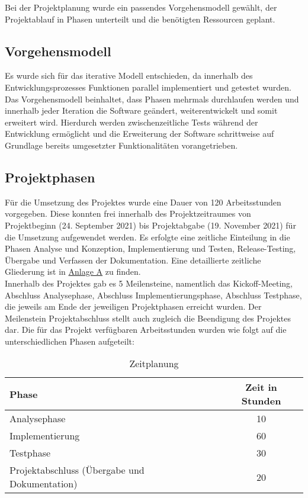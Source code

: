 Bei der Projektplanung wurde ein passendes Vorgehensmodell gewählt, der Projektablauf in Phasen unterteilt und die benötigten Ressourcen geplant.

\subsection{Vorgehensmodell}
    Es wurde sich für das iterative Modell entschieden, da innerhalb des Entwicklungsprozesses Funktionen parallel implementiert und getestet wurden. Das Vorgehensmodell beinhaltet, dass Phasen mehrmals durchlaufen werden und innerhalb jeder Iteration die Software geändert, weiterentwickelt und somit erweitert wird. Hierdurch werden zwischenzeitliche Tests während der Entwicklung ermöglicht und die Erweiterung der Software schrittweise auf Grundlage bereits umgesetzter Funktionalitäten vorangetrieben.

\subsection{Projektphasen}
    Für die Umsetzung des Projektes wurde eine Dauer von 120 Arbeitsstunden vorgegeben. Diese konnten frei innerhalb des Projektzeitraumes von Projektbeginn (24. September 2021) bis Projektabgabe (19. November 2021) für die Umsetzung aufgewendet werden. Es erfolgte eine zeitliche Einteilung in die Phasen Analyse und Konzeption, Implementierung und Testen, Release-Testing, Übergabe und Verfassen der Dokumentation. Eine detaillierte zeitliche Gliederung ist in \hyperref[anlage:zeitplanung]{Anlage A} zu finden.\\
    Innerhalb des Projektes gab es 5 Meilensteine, namentlich das \glqq Kickoff-Meeting\grqq{}, \glqq Abschluss Analysephase\grqq{}, \glqq Abschluss Implementierungsphase\grqq{}, \glqq Abschluss Testphase\grqq{}, die jeweils am Ende der jeweiligen Projektphasen erreicht wurden. Der Meilenstein \glqq Projektabschluss\grqq{} stellt auch zugleich die Beendigung des Projektes dar. Die für das Projekt verfügbaren Arbeitsstunden wurden wie folgt auf die unterschiedlichen Phasen aufgeteilt:\\

    \vspace{1cm}
    \begin{table}[h]
        \centering
        \begin{tabular}{l|c}
            Phase & Zeit in Stunden \\
            \hline
            Analysephase & 10 \\
            Implementierung & 60 \\
            Testphase & 30 \\
            Projektabschluss (Übergabe und Dokumentation) & 20
        \end{tabular}
        \caption{Zeitplanung}
    \end{table}
\pagebreak
